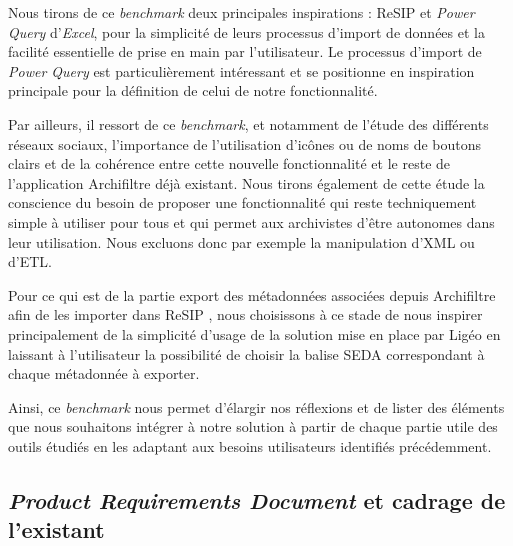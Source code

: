 Nous tirons de ce \textit{\gls{benchmark}} deux principales inspirations : ReSIP et \textit{Power Query} d’\textit{Excel}, pour la simplicité de leurs processus d’import de données et la facilité essentielle de prise en main par l’utilisateur. Le processus d’import de \textit{Power Query} est particulièrement intéressant et se positionne en inspiration principale pour la définition de celui de notre fonctionnalité. 

\clearpage %



Par ailleurs, il ressort de ce \textit{\gls{benchmark}}, et notamment de l’étude des différents réseaux sociaux, l’importance de l’utilisation d’icônes ou de noms de boutons clairs et de la cohérence entre cette nouvelle fonctionnalité et le reste de l’application \gls{Archifiltre} déjà existant. Nous tirons également de cette étude la conscience du besoin de proposer une fonctionnalité qui reste techniquement simple à utiliser pour tous et qui permet aux archivistes d’être autonomes dans leur utilisation. Nous excluons donc par exemple la manipulation d’\gls{XML} ou d’\gls{ETL}.


Pour ce qui est de la partie export des métadonnées associées depuis \gls{Archifiltre} afin de les importer dans ReSIP , nous choisissons à ce stade de nous inspirer principalement de la simplicité d’usage de la solution mise en place par Ligéo en laissant à l’utilisateur la possibilité de choisir la balise \gls{SEDA} correspondant à chaque métadonnée à exporter.

\clearpage %




Ainsi, ce \textit{\gls{benchmark}} nous permet d’élargir nos réflexions et de lister des éléments que nous souhaitons intégrer à notre solution à partir de chaque partie utile des outils étudiés en les adaptant aux besoins utilisateurs identifiés précédemment.

\subsection{\textit{Product Requirements Document} et cadrage de l’existant}

